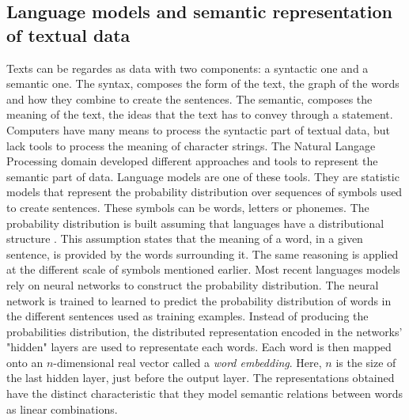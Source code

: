 \subsection{Language models and semantic representation of textual data}
Texts can be regardes as data with two components: a syntactic one and a semantic one.
The syntax, composes the form of the text, the graph of the words and how they combine to create the sentences.
The semantic, composes the meaning of the text, the ideas that the text has to convey through a statement.
Computers have many means to process the syntactic part of textual data, but lack tools
to process the meaning of character strings.
The Natural Langage Processing domain developed different approaches and tools to represent
the semantic part of data.
Language models are one of these tools.
They are statistic models that represent the probability distribution over sequences of
symbols used to create sentences.
These symbols can be words, letters or phonemes.
The probability distribution is built assuming that languages have a distributional structure \parencite{harrisDistributionalStructure1954}.
This assumption states that the meaning of a word, in a given sentence, is provided by the words surrounding it.
The same reasoning is applied at the different scale of symbols mentioned earlier.
Most recent languages models rely on neural networks to construct the probability distribution.
The neural network is trained to learned to predict the probability distribution of words in the different
sentences used as training examples.
Instead of producing the probabilities distribution, the distributed representation encoded
in the networks' "hidden" layers are used to representate each words.
Each word is then mapped onto an \(n\)-dimensional real vector called a \textit{word embedding}.
Here, \(n\) is the size of the last hidden layer, just before the output layer.
The representations obtained have the distinct characteristic that they model
semantic relations between words as linear combinations.

